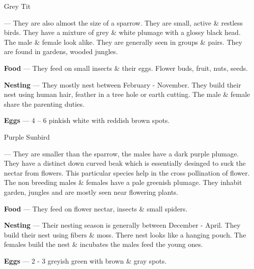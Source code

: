 \begin{bird}{Grey Tit}

 --- They are also almost the size of a sparrow. They are small, active \& restless birds. They have a mixture of grey \& white plumage with a glossy black head. The male \& female look alike. They are generally seen in groups \& pairs. They are found in gardens, wooded jungles. 

{\large\bf Food} --- They feed on small insects \& their eggs. Flower buds, fruit, nuts, seeds.

{\large\bf Nesting} --- They mostly nest between February - November. They build their nest using human hair, feather in a tree hole or earth cutting. The male \& female share the parenting duties.

{\large\bf Eggs} --- 4 -- 6 pinkish white with reddish brown spots.
\end{bird}

\begin{bird}{Purple Sunbird}

 --- They are smaller than the sparrow, the males have a dark purple plumage. They have a distinct down curved beak which is essentially desinged to suck the nectar from flowers. This particular species help in the cross pollination of flower. The non breeding males \& females have a pale greenish plumage. They inhabit garden, jungles and are mostly seen near flowering plants.

{\large\bf Food} --- They feed on flower nectar, insects \& small spiders.

{\large\bf Nesting} --- Their nesting season is generally between December - April. They build their nest using fibers \& moss. There nest looks like a hanging pouch. The females build the nest \& incubates the males feed the young ones.

{\large\bf Eggs} --- 2 - 3 greyish green with brown \& gray spots.
\end{bird}

